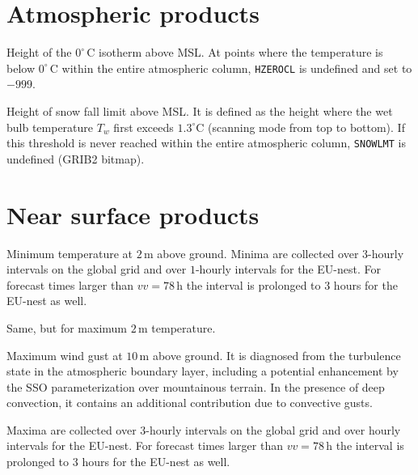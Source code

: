 \section{Atmospheric products}
\begin{description}[leftmargin=3.0cm,style=sameline]
 \item [HZEROCL] Height of the $0^{\circ}\,\mathrm{C}$ isotherm above MSL. At points where the temperature is below 
                 $0^{\circ}\,\mathrm{C}$ within the entire atmospheric column, \texttt{HZEROCL} is undefined 
                 and set to $-999$.
 \item [SNOWLMT] Height of snow fall limit above MSL. It is defined as the height where the wet bulb 
                 temperature $T_{w}$ first exceeds $1.3^{\circ}\mathrm{C}$ (scanning mode from top to bottom). 
                 If this threshold is never reached within the entire atmospheric column, \texttt{SNOWLMT} 
                 is undefined (GRIB2 bitmap).
\end{description}


\section{Near surface products}
\begin{description}[leftmargin=3.0cm,style=sameline]
  \item [TMIN\_2M]  Minimum temperature at $2\,\mathrm{m}$ above ground. Minima are collected over $3$-hourly intervals 
                    on the global grid and over $1$-hourly intervals for the EU-nest. For forecast times larger than  
                    $vv=78\,\mathrm{h}$ the interval is prolonged to $3$ hours for the EU-nest as well. 
  \item [TMAX\_2M]  Same, but for maximum $2\,\mathrm{m}$ temperature.
  \item [VMAX\_10M] Maximum wind gust at $10\,\mathrm{m}$ above ground. It is diagnosed from the turbulence state 
                    in the atmospheric boundary layer, including a potential enhancement by the SSO parameterization 
                    over mountainous terrain. In the presence of deep convection, it contains an additional contribution 
                    due to convective gusts. 
                    
                    Maxima are collected over $3$-hourly intervals on the global grid and over hourly intervals 
                    for the EU-nest. For forecast times larger than $vv=78\,\mathrm{h}$ the interval is prolonged 
                    to $3$ hours for the EU-nest as well.
\end{description}



